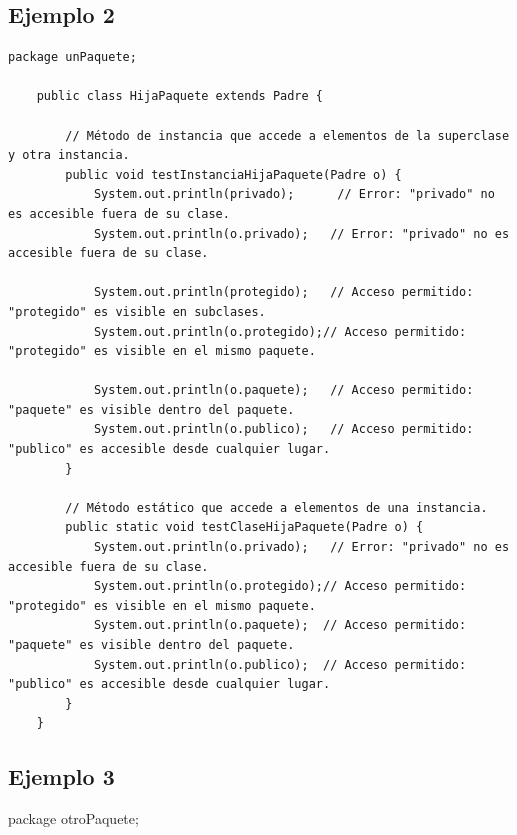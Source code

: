 \documentclass[a4paper,12pt]{article}
\begin{document}
\subsection{Ejemplo 2}
\begin{lstlisting}[style=customjava]
    package unPaquete;
    
    public class HijaPaquete extends Padre {
    
        // Método de instancia que accede a elementos de la superclase y otra instancia.
        public void testInstanciaHijaPaquete(Padre o) {
            System.out.println(privado);      // Error: "privado" no es accesible fuera de su clase.
            System.out.println(o.privado);   // Error: "privado" no es accesible fuera de su clase.
    
            System.out.println(protegido);   // Acceso permitido: "protegido" es visible en subclases.
            System.out.println(o.protegido);// Acceso permitido: "protegido" es visible en el mismo paquete.
    
            System.out.println(o.paquete);   // Acceso permitido: "paquete" es visible dentro del paquete.
            System.out.println(o.publico);   // Acceso permitido: "publico" es accesible desde cualquier lugar.
        }
    
        // Método estático que accede a elementos de una instancia.
        public static void testClaseHijaPaquete(Padre o) {
            System.out.println(o.privado);   // Error: "privado" no es accesible fuera de su clase.
            System.out.println(o.protegido);// Acceso permitido: "protegido" es visible en el mismo paquete.
            System.out.println(o.paquete);  // Acceso permitido: "paquete" es visible dentro del paquete.
            System.out.println(o.publico);  // Acceso permitido: "publico" es accesible desde cualquier lugar.
        }
    }
    \end{lstlisting}

\subsection{Ejemplo 3}
package otroPaquete;
\end{document}
